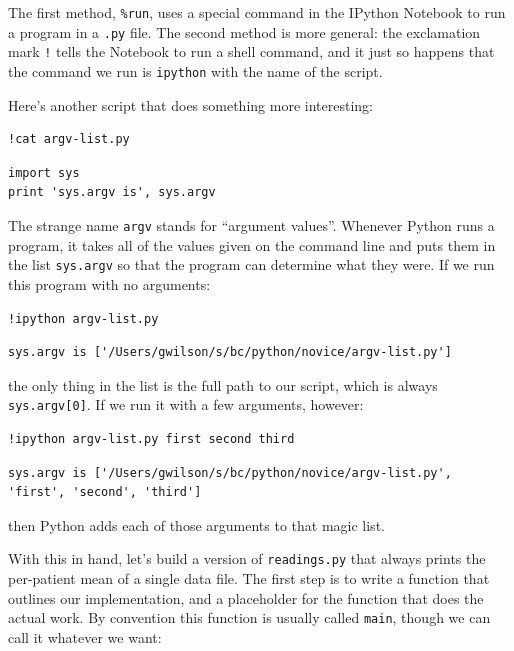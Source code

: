 \documentclass{book}
\begin{document}
The first method, \texttt{\%run}, uses a special command in the IPython
Notebook to run a program in a \texttt{.py} file. The second method is
more general: the exclamation mark \texttt{!} tells the Notebook to run
a shell command, and it just so happens that the command we run is
\texttt{ipython} with the name of the script.

Here's another script that does something more interesting:

\begin{verbatim}
!cat argv-list.py
\end{verbatim}

\begin{verbatim}
import sys
print 'sys.argv is', sys.argv
\end{verbatim}

The strange name \texttt{argv} stands for ``argument values''. Whenever
Python runs a program, it takes all of the values given on the command
line and puts them in the list \texttt{sys.argv} so that the program can
determine what they were. If we run this program with no arguments:

\begin{verbatim}
!ipython argv-list.py
\end{verbatim}

\begin{verbatim}
sys.argv is ['/Users/gwilson/s/bc/python/novice/argv-list.py']
\end{verbatim}

the only thing in the list is the full path to our script, which is
always \texttt{sys.argv{[}0{]}}. If we run it with a few arguments,
however:

\begin{verbatim}
!ipython argv-list.py first second third
\end{verbatim}

\begin{verbatim}
sys.argv is ['/Users/gwilson/s/bc/python/novice/argv-list.py', 'first', 'second', 'third']
\end{verbatim}

then Python adds each of those arguments to that magic list.

With this in hand, let's build a version of \texttt{readings.py} that
always prints the per-patient mean of a single data file. The first step
is to write a function that outlines our implementation, and a
placeholder for the function that does the actual work. By convention
this function is usually called \texttt{main}, though we can call it
whatever we want:
\end{document}
